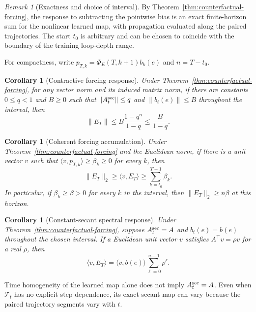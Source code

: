 \documentclass[letterpaper]{article} %
\newcommand{\norm}[1]{\lVert#1\rVert}
\newcommand{\Tmap}{\mathcal{T}}
\newtheorem{corollary}[theorem]{Corollary}
\theoremstyle{remark}
\newtheorem*{remark}{Remark}
\begin{document}
\begin{remark}[Exactness and choice of interval]
	By Theorem~\ref{thm:counterfactual-forcing}, the response to subtracting the pointwise bias is an exact finite-horizon sum for the nonlinear learned map, with propagation evaluated along the paired trajectories.  The start $t_0$ is arbitrary and can be chosen to coincide with the boundary of the training loop-depth range.
\end{remark}

For compactness, write $p_{T,k}=\Phi_E(T,k+1)b_k(e)$ and $n=T-t_0$.

\begin{corollary}[Contractive forcing response]
	\label{cor:contractive-forcing}
	Under Theorem~\ref{thm:counterfactual-forcing}, for any vector norm and its induced matrix norm, if there are constants $0\leq q<1$ and $B\geq0$ such that $\norm{A_t^{\rm sec}}\leq q$ and $\norm{b_t(e)}\leq B$ throughout the interval, then
	\begin{equation}
		\norm{E_T}
		\leq B\frac{1-q^n}{1-q}
		\leq\frac{B}{1-q}.
	\end{equation}
\end{corollary}

\begin{corollary}[Coherent forcing accumulation]
	\label{cor:coherent-forcing}
	Under Theorem~\ref{thm:counterfactual-forcing} and the Euclidean norm, if there is a unit vector $v$ such that $\langle v,p_{T,k}\rangle\geq\beta_k\geq0$ for every $k$, then
	\begin{equation}
		\norm{E_T}_2\geq\langle v,E_T\rangle
		\geq\sum_{k=t_0}^{T-1}\beta_k.
	\end{equation}
	In particular, if $\beta_k\geq\beta>0$ for every $k$ in the interval, then $\norm{E_T}_2\geq n\beta$ at this horizon.
\end{corollary}

\begin{corollary}[Constant-secant spectral response]
	\label{cor:spectral-forcing}
	Under Theorem~\ref{thm:counterfactual-forcing}, suppose $A_t^{\rm sec}=A$ and $b_t(e)=b(e)$ throughout the chosen interval.  If a Euclidean unit vector $v$ satisfies $A^\top v=\rho v$ for a real $\rho$, then
	\begin{equation}
		\langle v,E_T\rangle
		=\langle v,b(e)\rangle\sum_{\ell=0}^{n-1}\rho^\ell.
	\end{equation}
\end{corollary}

Time homogeneity of the learned map alone does not imply $A_t^{\rm sec}=A$.  Even when $\Tmap_t$ has no explicit step dependence, its exact secant map can vary because the paired trajectory segments vary with $t$.
\end{document}
